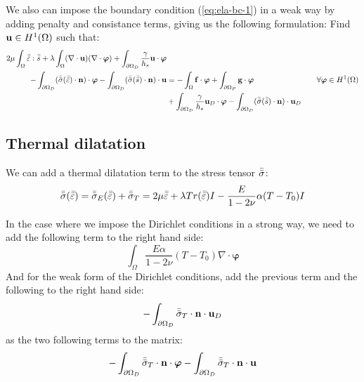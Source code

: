 We also can impose the boundary condition (\ref{eq:ela-bc-1}) in a weak way by
adding penalty and consistance terms, giving us the following formulation:
Find $\mathbf{u}\in H^1(\Omega)$ such that:
\begin{alignat}{2}
  2\mu \int_\Omega \bar{\bar{\varepsilon}}:\bar{\bar{s}}
  + \lambda \int_\Omega (\nabla\cdot\mathbf{u})(\nabla\cdot\bm{\varphi})
  + \int_{\partial \Omega_D} \frac{\gamma}{h_s} \mathbf{u} \cdot \bm{\varphi}
  &&& \nonumber \\
  - \int_{\partial \Omega_D}
  (\bar{\bar{\sigma}}(\bar{\bar{\varepsilon}}) \cdot \mathbf{n}) \cdot \bm{\varphi}
  - \int_{\partial \Omega_D} (\bar{\bar{\sigma}}(\bar{\bar{s}}) \cdot \mathbf{n}) \cdot \mathbf{u}
  &= - \int_\Omega \mathbf{f}\cdot\bm{\varphi}
  + \int_{\partial\Omega_P} \mathbf{g}\cdot\bm{\varphi}
  && \quad \forall \bm{\varphi}\in H^1(\Omega) \label{eq:ela-vf-weak} \\
  & + \int_{\partial \Omega_D} \frac{\gamma}{h_s} \mathbf{u}_D \cdot \bm{\varphi}
  - \int_{\partial \Omega_D} (\bar{\bar{\sigma}}(\bar{\bar{s}}) \cdot \mathbf{n}) \cdot \mathbf{u}_D
  \nonumber
\end{alignat}

\subsection{Thermal dilatation}
We can add a thermal dilatation term to the stress tensor $\bar{\bar{\sigma}}$:
\begin{equation}
  \bar{\bar{\sigma}}(\bar{\bar{\varepsilon}})
  = \bar{\bar{\sigma}}_E(\bar{\bar{\varepsilon}}) + \bar{\bar{\sigma}}_T
  = 2\mu\bar{\bar{\varepsilon}} + \lambda Tr(\bar{\bar{\varepsilon}})I
  - \frac{E}{1-2\nu}\alpha(T-T_0)I
\end{equation}

In the case where we impose the Dirichlet conditions in a strong way, we need to
add the following term to the right hand side:
\begin{equation}
  \int_\Omega \frac{E\alpha}{1-2\nu}(T-T_0)\nabla\cdot\bm{\varphi}
\end{equation}
And for the weak form of the Dirichlet conditions, add the previous term and the
following to the right hand side:
\begin{equation}
  -\int_{\partial\Omega_D} \bar{\bar{\sigma}}_T\cdot\mathbf{n}\cdot\mathbf{u}_D
\end{equation}
as the two following terms to the matrix:
\begin{equation}
  -\int_{\partial\Omega_D} \bar{\bar{\sigma}}_T\cdot\mathbf{n}\cdot\bm{\varphi}
  -\int_{\partial\Omega_D} \bar{\bar{\sigma}}_T\cdot\mathbf{n}\cdot\mathbf{u}
\end{equation}
